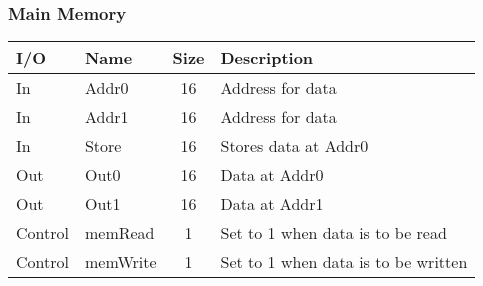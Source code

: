 		\subsubsection{Main Memory}
			\begin{center} \begin{tabular}{| l | l | c | l |} \hline
				I/O & Name  & Size & Description \\ \hline
				In  & Addr0 & 16   & Address for data\\ \hline
				In  & Addr1 & 16   & Address for data\\ \hline
				In  & Store & 16   & Stores data at Addr0\\ \hline
				Out & Out0  & 16   & Data at Addr0 \\ \hline
				Out & Out1  & 16   & Data at Addr1 \\ \hline
				Control & memRead  & 1 & Set to 1 when data is to be read\\ \hline
				Control & memWrite & 1 & Set to 1 when data is to be written\\ \hline
			\end{tabular} \end{center} \newpage \begin{landscape}

\end{landscape}
